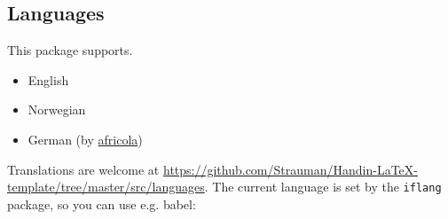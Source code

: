 \documentclass{article}
\let\oldhref\href
\gdef\href#1#2{{\color{magenta}\oldhref{#1}{#2}}}
\let\oldsubsection\subsection
\gdef\subsection{\needspace{0.2\paperheight}\oldsubsection}
\begin{document}
\subsection{Languages}
This package supports.
\begin{itemize}
\item English
\item Norwegian
\item German (by \href{https://github.com/africola}{africola})


\end{itemize}
Translations are welcome at \url{https://github.com/Strauman/Handin-LaTeX-template/tree/master/src/languages}.
The current language is set by the \texttt{iflang} package, so you can use e.g. babel:
\begin{dispListing}
\usepackage[german]{babel}
\end{dispListing}
\end{document}
